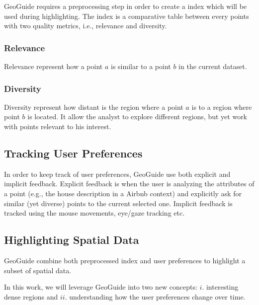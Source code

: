 GeoGuide requires a preprocessing step in order to create a index which will be used during highlighting. The index is a comparative table between every points with two quality metrics, i.e., relevance and diversity.

\subsubsection{Relevance}

Relevance represent how a point $a$ is similar to a point $b$ in the current dataset.

\subsubsection{Diversity}

Diversity represent how distant is the region where a point $a$ is to a region where point $b$ is located. It allow the analyst to explore different regions, but yet work with points relevant to his interest.

\subsection{Tracking User Preferences}

In order to keep track of user preferences, GeoGuide use both explicit and implicit feedback. Explicit feedback is when the user is analyzing the attributes of a point (e.g., the house description in a Airbnb context) and explicitly ask for similar (yet diverse) points to the current selected one. Implicit feedback is tracked using the mouse movements, eye/gaze tracking etc.

\subsection{Highlighting Spatial Data}

GeoGuide combine both preprocessed index and user preferences to highlight a subset of spatial data.

\vspace{25pt}

In this work, we will leverage GeoGuide into two new concepts: $i$. interesting dense regions and $ii$. understanding how the user preferences change over time.
